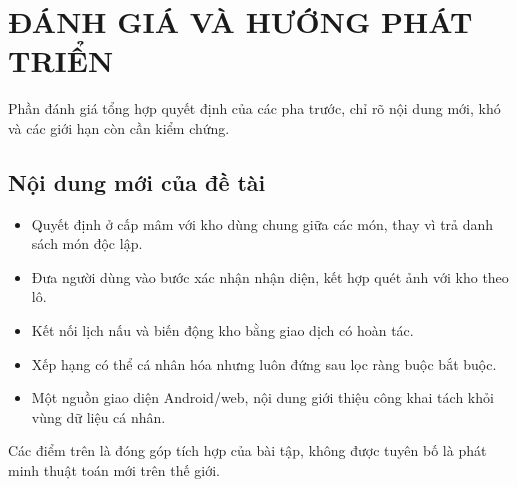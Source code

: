 \chapter{ĐÁNH GIÁ VÀ HƯỚNG PHÁT TRIỂN}
Phần đánh giá tổng hợp quyết định của các pha trước, chỉ rõ nội dung mới, khó và các giới hạn còn cần kiểm chứng.

\section{Nội dung mới của đề tài}
\begin{itemize}
\item Quyết định ở cấp mâm với kho dùng chung giữa các món, thay vì trả danh sách món độc lập.
\item Đưa người dùng vào bước xác nhận nhận diện, kết hợp quét ảnh với kho theo lô.
\item Kết nối lịch nấu và biến động kho bằng giao dịch có hoàn tác.
\item Xếp hạng có thể cá nhân hóa nhưng luôn đứng sau lọc ràng buộc bắt buộc.
\item Một nguồn giao diện Android/\allowbreak{}web, nội dung giới thiệu công khai tách khỏi vùng dữ liệu cá nhân.
\end{itemize}
Các điểm trên là đóng góp tích hợp của bài tập, không được tuyên bố là phát minh thuật toán mới trên thế giới.

